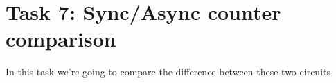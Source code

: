 \documentclass[a4paper,12pt]{article}
\begin{document}
\section*{Task 7: Sync/Async counter comparison}

In this task we're going to compare the difference between these two circuits
\end{document}

